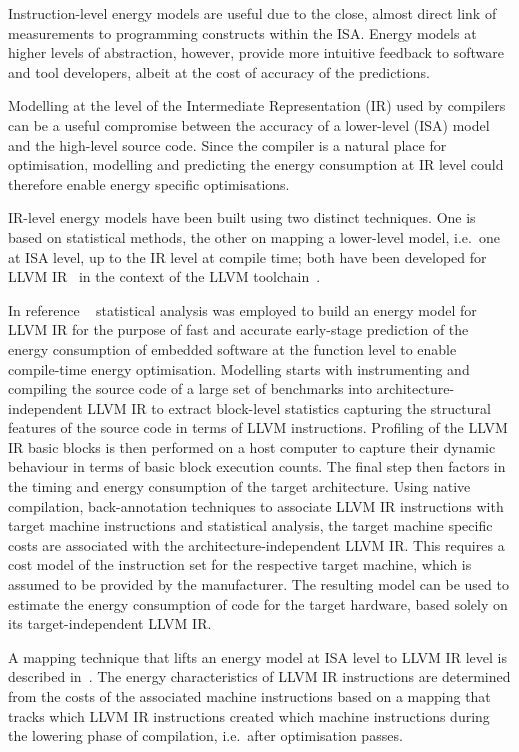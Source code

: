 Instruction-level energy models are 
useful 
due to the close, almost direct
link of measurements to programming constructs within the ISA. Energy models at
higher levels of abstraction, however, provide more intuitive feedback to
software and tool developers, 
albeit 
at the cost of accuracy of the
predictions. 

Modelling at the level of the Intermediate Representation (IR) used by
compilers can be a useful compromise between the accuracy of a lower-level
(ISA) model and the high-level source code. Since the compiler is a natural
place for optimisation, modelling and predicting the energy consumption at IR
level could therefore enable energy specific optimisations.

IR-level energy models have been built using two distinct techniques. One is
based on statistical methods, the other on mapping a lower-level model, i.e.\
one at ISA level, up to the IR level at compile time; both have been developed
for LLVM IR~\cite{LattnerLLVM2004} in the context of the LLVM
toolchain~\cite{LLVM}.

In reference ~\cite{Brandolese2011} statistical analysis was employed to build an
energy model for LLVM IR for the purpose of fast and accurate early-stage
prediction of the energy consumption of embedded software at the function level
to enable compile-time energy optimisation.
%
Modelling starts with instrumenting and compiling the source code of a large
set of benchmarks into architecture-independent LLVM IR to extract block-level
statistics capturing the structural features of the source code in terms of
LLVM instructions. 
%
Profiling of the LLVM IR basic blocks is then performed on a host computer to
capture their dynamic behaviour in terms of basic block execution counts. 
%
The final step then factors in the timing and energy consumption of the target
architecture. Using native compilation, back-annotation techniques to associate
LLVM IR instructions with target machine instructions and statistical analysis,
the target machine specific costs are associated with the
architecture-independent LLVM IR. This requires a cost model of the instruction
set for the respective target machine, which is assumed to be provided by the
manufacturer. The resulting model can be used to estimate the energy
consumption of code for the target hardware, based solely on its
target-independent LLVM IR.

A 
mapping technique that lifts an energy model at ISA level to LLVM IR
level is described in~\cite{Georgiou15}. The energy characteristics of LLVM IR
instructions are determined from the costs of the associated machine
instructions based on a mapping that tracks which LLVM IR instructions created
which machine instructions during the lowering phase of compilation, i.e.\
after optimisation passes. 

